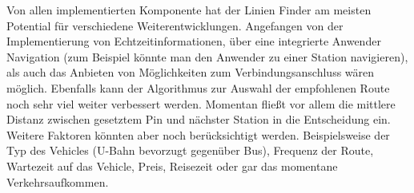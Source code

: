     Von allen implementierten Komponente hat der Linien Finder am meisten Potential für verschiedene Weiterentwicklungen. Angefangen von der Implementierung von Echtzeitinformationen, über eine integrierte Anwender Navigation (zum Beispiel könnte man den Anwender zu einer Station navigieren), als auch das Anbieten von Möglichkeiten zum Verbindungsanschluss wären möglich. Ebenfalls kann der Algorithmus zur Auswahl der empfohlenen Route noch sehr viel weiter verbessert werden. Momentan fließt vor allem die mittlere Distanz zwischen gesetztem Pin und nächster Station in die Entscheidung ein. Weitere Faktoren könnten aber noch berücksichtigt werden. Beispielsweise der Typ des Vehicles (U-Bahn bevorzugt gegenüber Bus), Frequenz der Route, Wartezeit auf das Vehicle, Preis, Reisezeit oder gar das momentane Verkehrsaufkommen.
    
  

  
